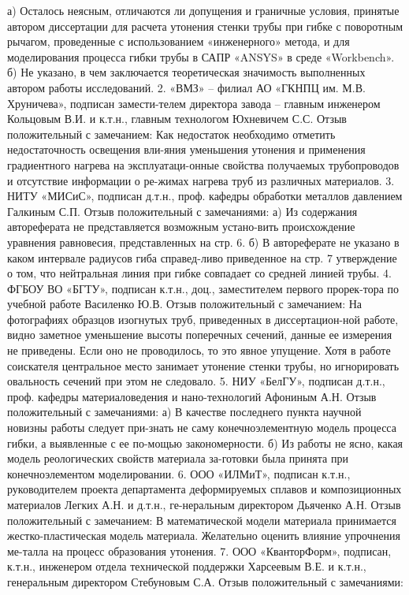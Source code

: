 а) Осталось неясным, отличаются ли допущения и граничные условия, принятые автором диссертации для расчета утонения стенки трубы при гибке с поворотным рычагом, проведенные с использованием «инженерного» метода, и для моделирования процесса гибки трубы в САПР «ANSYS» в среде «Workbench».
б) Не указано, в чем заключается теоретическая значимость выполненных автором работы исследований.
2. «ВМЗ» – филиал АО «ГКНПЦ им. М.В. Хруничева», подписан замести-телем директора завода – главным инженером Кольцовым В.И. и к.т.н., главным технологом Юхневичем С.С. Отзыв положительный с замечанием:
Как недостаток необходимо отметить недостаточность освещения вли-яния уменьшения утонения и применения градиентного нагрева на эксплуатаци-онные свойства получаемых трубопроводов и отсутствие информации о ре-жимах нагрева труб из различных материалов.
3. НИТУ «МИСиС», подписан д.т.н., проф. кафедры обработки металлов давлением Галкиным С.П. Отзыв положительный с замечаниями:
а) Из содержания автореферата не представляется возможным устано-вить происхождение уравнения равновесия, представленных на стр. 6.
б) В автореферате не указано в каком интервале радиусов гиба справед-ливо приведенное на стр. 7 утверждение о том, что нейтральная линия при гибке совпадает со средней линией трубы.
4. ФГБОУ ВО «БГТУ», подписан к.т.н., доц., заместителем первого прорек-тора по учебной работе Василенко Ю.В. Отзыв положительный с замечанием:
На фотографиях образцов изогнутых труб, приведенных в диссертацион-ной работе, видно заметное уменьшение высоты поперечных сечений, данные ее измерения не приведены. Если оно не проводилось, то это явное упущение. Хотя в работе соискателя центральное место занимает утонение стенки трубы, но игнорировать овальность сечений при этом не следовало.
5. НИУ «БелГУ», подписан д.т.н., проф. кафедры материаловедения и нано-технологий Афониным А.Н. Отзыв положительный с замечаниями:
а) В качестве последнего пункта научной новизны работы следует при-знать не саму конечноэлементную модель процесса гибки, а выявленные с ее по-мощью закономерности.
б) Из работы не ясно, какая модель реологических свойств материала за-готовки была принята при конечноэлементом моделировании.
6. ООО «ИЛМиТ», подписан к.т.н., руководителем проекта департамента деформируемых сплавов и композиционных материалов Легких А.Н. и д.т.н., ге-неральным директором Дьяченко А.Н. Отзыв положительный с замечанием:
В математической модели материала принимается жестко-пластическая модель материала. Желательно оценить влияние упрочнения ме-талла на процесс образования утонения.
7. ООО «КванторФорм», подписан, к.т.н., инженером отдела технической поддержки Харсеевым В.Е. и к.т.н., генеральным директором Стебуновым С.А. Отзыв положительный с замечаниями:

